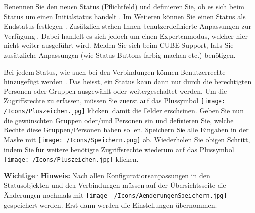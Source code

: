 Benennen Sie den neuen Status  (Pflichtfeld) und definieren Sie, ob es sich beim Status um einen Initialstatus handelt . Im Weiteren können Sie einen Status als Endstatus festlegen . Zusätzlich stehen Ihnen benutzerdefinierte Anpassungen zur Verfügung . Dabei handelt es sich jedoch um einen Expertenmodus, welcher hier nicht weiter ausgeführt wird. Melden Sie sich beim CUBE Support, falls Sie zusätzliche Anpassungen (wie Status-Buttons farbig machen etc.) benötigen.

\vspace{\baselineskip}

Bei jedem Status, wie auch bei den Verbindungen können Benutzerrechte hinzugefügt werden . Das heisst, ein Status kann dann nur durch die berechtigten Personen oder Gruppen ausgewählt oder weitergeschaltet werden. Um die Zugriffsrechte zu erfassen, müssen Sie zuerst auf das Plussymbol \texttt{[image: /Icons/Pluszeichen.jpg]}  klicken, damit die Felder erscheinen. Geben Sie nun die gewünschten Gruppen oder/und Personen ein und definieren Sie, welche Rechte diese Gruppen/Personen haben sollen. Speichern Sie alle Eingaben in der Maske mit \texttt{[image: /Icons/Speichern.png]}  ab. Wiederholen Sie obigen Schritt, indem Sie für weitere benötigte Zugriffsrechte wiederum auf das Plussymbol \texttt{[image: /Icons/Pluszeichen.jpg]}  klicken.

\vspace{\baselineskip}

\begin{mdframed}[backgroundcolor=orange!30] 
\textbf{Wichtiger Hinweis:} Nach allen Konfigurationsanpassungen in den Statusobjekten und den Verbindungen müssen auf der Übersichtsseite die Änderungen nochmals mit \texttt{[image: /Icons/AenderungenSpeichern.jpg]} gespeichert werden. Erst dann werden die Einstellungen übernommen.
\end{mdframed}


